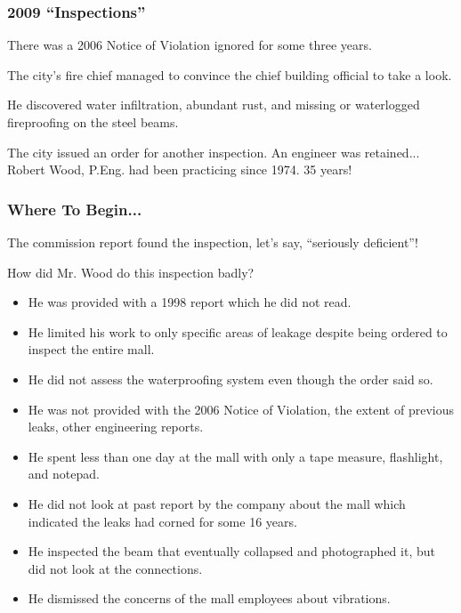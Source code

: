 \begin{frame}
\frametitle{2009 ``Inspections''}

There was a 2006 Notice of Violation ignored for some three years.

The city's fire chief managed to convince the chief building official to take a look.

He discovered water infiltration, abundant rust, and missing or waterlogged fireproofing on the steel beams.

The city issued an order for another inspection. An engineer was retained...\\
\quad Robert Wood, P.Eng. had been practicing since 1974. 35 years!

\end{frame}



\begin{frame}
\frametitle{Where To Begin...}

The commission report found the inspection, let's say, ``seriously deficient''!

How did Mr. Wood do this inspection badly?
\begin{itemize}
	\item He was provided with a 1998 report which he did not read.
	\item He limited his work to only specific areas of leakage despite being ordered to inspect the entire mall.
	\item He did not assess the waterproofing system even though the order said so.
	\item He was not provided with the 2006 Notice of Violation, the extent of previous leaks, other engineering reports.
	\item He spent less than one day at the mall with only a tape measure, flashlight, and notepad.
	\item He did not look at past report by the company about the mall which indicated the leaks had corned for some 16 years.
	\item He inspected the beam that eventually collapsed and photographed it, but did not look at the connections.
	\item He dismissed the concerns of the mall employees about vibrations.
\end{itemize}

\end{frame}



